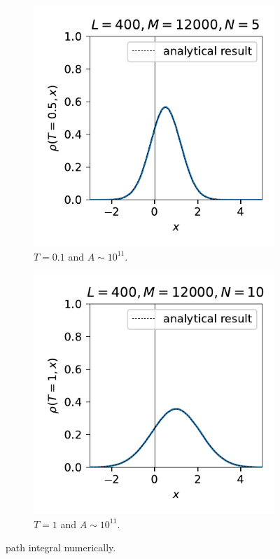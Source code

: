 \documentclass[10pt, a4paper]{article}
\numberwithin{equation}{section}
\begin{document}
\begin{itemize}
		\begin{figure}[H]
			\centering
			\begin{subfigure}{0.4\linewidth}
				\centering
				\includegraphics[scale=0.8]{figures/path integral numerically (normalized) of a free particle with initial state as a Gaussian wave packet and T=0.5 (L=400, M=12000, N=5).pdf}
				\caption{$T = 0.1$ and $A \sim 10^{11}$.}
			\end{subfigure}
			\begin{subfigure}{0.4\linewidth}
				\centering
				\includegraphics[scale=0.8]{figures/path integral numerically (normalized) of a free particle with initial state as a Gaussian wave packet and T=1 (L=400, M=12000, N=10).pdf}
				\caption{$T = 1$ and $A \sim 10^{11}$.}
			\end{subfigure}
			\caption{path integral numerically.}
		\end{figure}
	\end{itemize}
\end{document}
